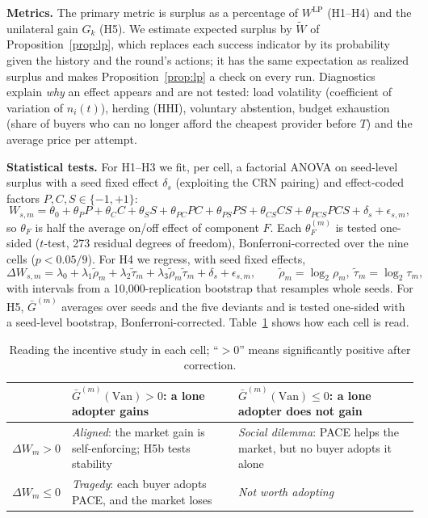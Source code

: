 \documentclass{article}
\newcommand{\WLP}{W^{\mathrm{LP}}}
\begin{document}
\textbf{Metrics.} The primary metric is surplus as a percentage of $\WLP$ (H1--H4) and the unilateral gain $G_k$ (H5). We estimate expected surplus by $\widetilde W$ of Proposition~\ref{prop:lp}, which replaces each success indicator by its probability given the history and the round's actions; it has the same expectation as realized surplus and makes Proposition~\ref{prop:lp} a check on every run. Diagnostics explain \emph{why} an effect appears and are not tested: load volatility (coefficient of variation of $n_i(t)$), herding (HHI), voluntary abstention, budget exhaustion (share of buyers who can no longer afford the cheapest provider before $T$) and the average price per attempt.

\textbf{Statistical tests.} For H1--H3 we fit, per cell, a factorial ANOVA on seed-level surplus with a seed fixed effect $\delta_s$ (exploiting the CRN pairing) and effect-coded factors $P,C,S\in\{-1,+1\}$:
\begin{equation}
W_{s,m}=\theta_0+\theta_PP+\theta_CC+\theta_SS+\theta_{PC}PC+\theta_{PS}PS+\theta_{CS}CS+\theta_{PCS}PCS+\delta_s+\epsilon_{s,m},
\label{eq:anova}
\end{equation}
so $\theta_F$ is half the average on/off effect of component $F$. Each $\theta_F^{(m)}$ is tested one-sided ($t$-test, 273 residual degrees of freedom), Bonferroni-corrected over the nine cells ($p<0.05/9$). For H4 we regress, with seed fixed effects,
\begin{equation}
\Delta W_{s,m}=\lambda_0+\lambda_1\tilde\rho_m+\lambda_2\tilde\tau_m+\lambda_3\tilde\rho_m\tilde\tau_m+\delta_s+\epsilon_{s,m},\qquad \tilde\rho_m=\log_2\rho_m,\ \tilde\tau_m=\log_2\tau_m,
\label{eq:envreg}
\end{equation}
with intervals from a 10,000-replication bootstrap that resamples whole seeds. For H5, $\bar G^{(m)}$ averages over seeds and the five deviants and is tested one-sided with a seed-level bootstrap, Bonferroni-corrected. Table~\ref{tab:reading} shows how each cell is read.

\begin{table}[h]
\centering\small
\caption{Reading the incentive study in each cell; ``$>0$'' means significantly positive after correction.}
\label{tab:reading}
\begin{tabular}{@{}l p{6.2cm} p{6.2cm}@{}}
\toprule
 & $\bar G^{(m)}(\mathrm{Van})>0$: a lone adopter gains & $\bar G^{(m)}(\mathrm{Van})\le0$: a lone adopter does not gain\\
\midrule
$\Delta W_m>0$ & \emph{Aligned}: the market gain is self-enforcing; H5b tests stability & \emph{Social dilemma}: PACE helps the market, but no buyer adopts it alone\\
$\Delta W_m\le0$ & \emph{Tragedy}: each buyer adopts PACE, and the market loses & \emph{Not worth adopting}\\
\bottomrule
\end{tabular}
\end{table}
\end{document}
